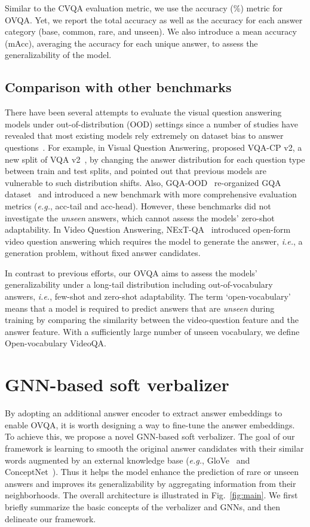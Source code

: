 \documentclass[10pt,twocolumn,letterpaper]{article}
\begin{document}
Similar to the CVQA evaluation metric, we use the accuracy (\%) metric for OVQA.
Yet, we report the total accuracy as well as the accuracy for each answer category (base, common, rare, and unseen).
We also introduce a mean accuracy (mAcc), averaging the accuracy for each unique answer, to assess the generalizability of the model. \subsection{Comparison with other benchmarks}

There have been several attempts to evaluate the visual question answering models under out-of-distribution (OOD) settings since a number of studies have revealed that most existing models rely extremely on dataset bias to answer questions~\cite{agrawal2018don,kervadec2021roses,niu2021counterfactual, ramakrishnan2018overcoming, cadene2019rubi}.
For example, in Visual Question Answering, \cite{agrawal2018don} proposed VQA-CP v2, a new split of VQA v2~\cite{goyal2017making}, by changing the answer distribution for each question type between train and test splits, and pointed out that previous models are vulnerable to such distribution shifts.
Also, GQA-OOD~\cite{kervadec2021roses} re-organized GQA dataset~\cite{hudson2019gqa} and introduced a new benchmark with more comprehensive evaluation metrics (\textit{e.g.}, acc-tail and acc-head).
However, these benchmarks did not investigate the \textit{unseen} answers, which cannot assess the models’ zero-shot adaptability.
In Video Question Answering, NExT-QA~\cite{xiao2021next} introduced open-form video question answering which requires the model to generate the answer, \textit{i.e.}, a generation problem, without fixed answer candidates.

In contrast to previous efforts, our OVQA aims to assess the models' generalizability under a long-tail distribution including out-of-vocabulary answers, \textit{i.e.}, few-shot and zero-shot adaptability.
The term `open-vocabulary' means that a model is required to predict answers that are \textit{unseen} during training by comparing the similarity between the video-question feature and the answer feature.
With a sufficiently large number of unseen vocabulary, we define Open-vocabulary VideoQA.  \section{GNN-based soft verbalizer}

By adopting an additional answer encoder to extract answer embeddings to enable OVQA, it is worth designing a way to fine-tune the answer embeddings.
To achieve this, we propose a novel GNN-based soft verbalizer.
The goal of our framework is learning to smooth the original answer candidates with their similar words augmented by an external knowledge base (\textit{e.g.}, GloVe~\cite{pennington2014glove} and ConceptNet~\cite{speer2017conceptnet}).
Thus it helps the model enhance the prediction of rare or unseen answers and improves its generalizability by aggregating information from their neighborhoods.
The overall architecture is illustrated in Fig.~\ref{fig:main}.
We first briefly summarize the basic concepts of the verbalizer and GNNs, and then delineate our framework.
\end{document}
